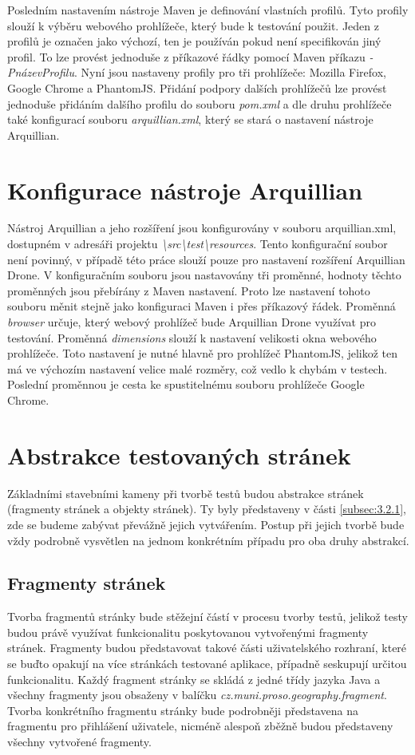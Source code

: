 \documentclass[
    color,   %
	table,   %
    twoside, %
    nolot, nolof
]{fithesis3}
\begin{document}
Posledním nastavením nástroje Maven je definování vlastních profilů. Tyto profily slouží k výběru webového prohlížeče, který bude k testování použit. Jeden z profilů je označen jako výchozí, ten je používán pokud není specifikován jiný profil. To lze provést jednoduše z příkazové řádky pomocí Maven příkazu \emph{-PnázevProfilu}. Nyní jsou nastaveny profily pro tři prohlížeče: Mozilla Firefox, Google Chrome a PhantomJS. Přidání podpory dalších prohlížečů lze provést jednoduše přidáním dalšího profilu do souboru \emph{pom.xml} a dle druhu prohlížeče také konfigurací souboru \emph{arquillian.xml}, který se stará o nastavení nástroje Arquillian.

\section{Konfigurace nástroje Arquillian}
Nástroj Arquillian a jeho rozšíření jsou konfigurovány v souboru arquillian.xml, dostupném v adresáři projektu \emph{\textbackslash src\textbackslash test\textbackslash resources}. Tento konfigurační soubor není povinný, v případě této práce slouží pouze pro nastavení rozšíření Arquillian Drone. V konfiguračním souboru jsou nastavovány tři proměnné, hodnoty těchto proměnných jsou přebírány z Maven nastavení. Proto lze nastavení tohoto souboru měnit stejně jako konfiguraci Maven i přes příkazový řádek. Proměnná \emph{browser} určuje, který webový prohlížeč bude Arquillian Drone využívat pro testování. Proměnná \emph{dimensions} slouží k nastavení velikosti okna webového prohlížeče. Toto nastavení je nutné hlavně pro prohlížeč PhantomJS, jelikož ten má ve výchozím nastavení velice malé rozměry, což vedlo k chybám v testech. Poslední proměnnou je cesta ke spustitelnému souboru prohlížeče Google Chrome.

\section{Abstrakce testovaných stránek}
\label{sec:5.4}
Základními stavebními kameny při tvorbě testů budou abstrakce stránek (fragmenty stránek a objekty stránek). Ty byly představeny v části \ref{subsec:3.2.1}, zde se budeme zabývat převážně jejich vytvářením. Postup při jejich tvorbě bude vždy podrobně vysvětlen na jednom konkrétním případu pro oba druhy abstrakcí.

\subsection{Fragmenty stránek}
Tvorba fragmentů stránky bude stěžejní částí v procesu tvorby testů, jelikož testy budou právě využívat funkcionalitu poskytovanou vytvořenými fragmenty stránek. Fragmenty budou představovat takové části uživatelského rozhraní, které se buďto opakují na více stránkách testované aplikace, případně seskupují určitou funkcionalitu. Každý fragment stránky se skládá z jedné třídy jazyka Java a všechny fragmenty jsou obsaženy v balíčku \emph{cz.muni.proso.geography.fragment}. Tvorba konkrétního fragmentu stránky bude podrobněji představena na fragmentu pro přihlášení uživatele, nicméně alespoň zběžně budou představeny všechny vytvořené fragmenty.
\end{document}
